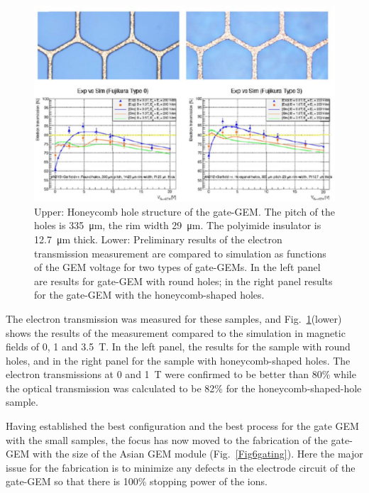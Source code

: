 \begin{figure}
\begin{center}
\includegraphics[width=.7\textwidth]{Tracker/TPC_Bonn/plots/TPC-Gate_Fig45gating.pdf}%
\caption{\label{Fig45gating} {Upper: Honeycomb hole structure of the gate-GEM.
The pitch of the holes is \SI{335}{\micro m}, the rim width \SI{29}{\micro m}.
The polyimide insulator is \SI{12.7}{\micro m} thick.
Lower: Preliminary results of the electron transmission measurement are compared to simulation
as functions of the GEM voltage for two types of gate-GEMs. In the left panel are
results for gate-GEM with round holes; in the right panel results for the gate-GEM with the honeycomb-shaped holes.}}
\end{center}
\end{figure}

The electron transmission was measured for these samples, and
Fig.~\ref{Fig45gating}(lower) shows the results of the measurement compared to the simulation in magnetic fields
of 0, 1 and \SI{3.5}{T}. In the left panel, the results for the sample with round holes, and in the right panel
for the sample with honeycomb-shaped holes.  The electron transmissions at 0 and \SI{1}{T} were confirmed
to be better than 80\% while the optical transmission was calculated to be 82\% for the honeycomb-shaped-hole sample.

Having established the best configuration and the best process for the gate GEM with the small samples,
the focus has now moved to the fabrication of the gate-GEM with  the size of the Asian GEM module (Fig.~\ref{Fig6gating}).
Here the major issue for the fabrication is to minimize any defects in the electrode circuit of the gate-GEM
so that there is 100\% stopping power of the ions.

